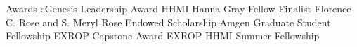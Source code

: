 \begin{rubric}{Awards}
\entry*[2020]
  eGenesis Leadership Award
\entry*[2019]
    HHMI Hanna Gray Fellow Finalist
\entry*[2015]
  Florence C. Rose and S. Meryl Rose Endowed Scholarship
\entry*[2014]
  Amgen Graduate Student Fellowship
\entry*[2012]
  EXROP Capstone Award
\entry*[2011]
  EXROP HHMI Summer Fellowship

\end{rubric}
